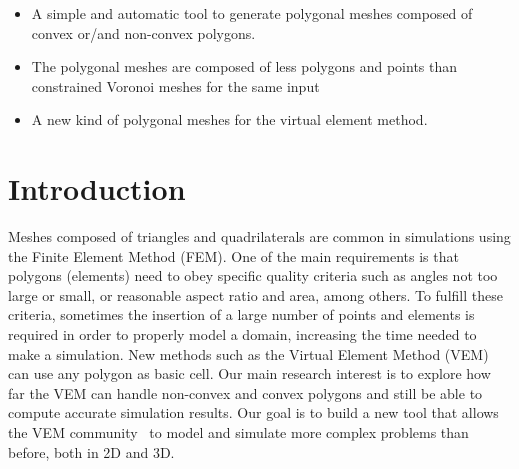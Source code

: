 \documentclass[lineno,pdflatex,sn-mathphys]{sn-jnl}%
\theoremstyle{thmstyleone}%
\theoremstyle{thmstyletwo}%
\theoremstyle{thmstylethree}%
\begin{document}
\begin{itemize}
\item A simple and automatic tool to generate polygonal meshes 
composed of convex or/and non-convex polygons. %
\item The polygonal meshes are composed of less polygons and points than constrained Voronoi meshes for the same input 
\item A new kind of polygonal meshes  for the virtual element method. %


\end{itemize}

\section{Introduction}\label{sec1}

Meshes composed of  triangles and quadrilaterals are common in simulations using the Finite Element Method (FEM). One of the main requirements is that polygons (elements)  need to obey specific quality criteria such as  angles not too large or small, or reasonable aspect ratio and  area,  among others. To fulfill these criteria, sometimes the insertion of a large number of points and elements is required in order to properly model a domain, increasing the time needed to make a simulation. New methods such as the Virtual Element Method (VEM)~\cite{Basisprinciples,Brezzi2015} can use any polygon as basic cell. Our main research interest is to explore how far the VEM can handle non-convex and convex polygons and still be able to compute accurate simulation results. Our goal is to build a new tool that allows the VEM community~\cite{Wriggers2019} to model and simulate more complex problems than before, both in 2D and 3D.
\end{document}
